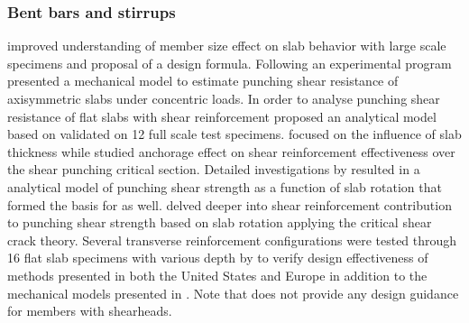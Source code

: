 \documentclass[twocolumn]{article} %
\begin{document}
\subsubsection{Bent bars and stirrups}
\cite{bavzant1987size} improved understanding of member size effect on slab behavior with large scale specimens and proposal of a design formula. Following an experimental program \cite{shehata1989punching} presented a mechanical model to estimate punching shear resistance of axisymmetric slabs under concentric loads.  In order to analyse punching shear resistance of flat slabs with shear reinforcement \cite{gomes1999} proposed an analytical model based on \cite{kinnunen1960,shehata1989punching} validated on 12 full scale test specimens. \cite{birkle2008} focused on the influence of slab thickness while \cite{beutel2002} studied anchorage effect on shear reinforcement effectiveness over the shear punching critical section. Detailed investigations by \cite{guandalini2009punching,muttoni2008punching} resulted in a analytical model of punching shear strength as a function of slab rotation that formed the basis for \cite{mc2010} as well. \cite{ruiz2009} delved deeper into shear reinforcement contribution to punching shear strength based on slab rotation applying the critical shear crack theory. Several transverse reinforcement configurations were tested through 16 flat slab specimens with various depth by \cite{lips2012} to verify design effectiveness of methods presented in both the United States and Europe \cite{ACI-318M2014,en1992} in addition to the mechanical models presented in \cite{muttoni2008punching,ruiz2009}. Note that \cite{en1992} does not provide any design guidance for members with shearheads. 
\end{document}
